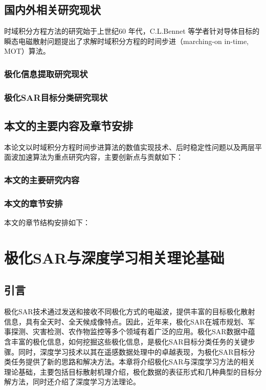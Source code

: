 \documentclass[promaster]{thesis-uestc}
\begin{document}
\section{国内外相关研究现状}
时域积分方程方法的研究始于上世纪60 年代，C.L.Bennet 等学者针对导体目标的瞬态电磁散射问题提出了求解时域积分方程的时间步进（marching-on in-time, MOT）算法。

\subsection{极化信息提取研究现状}
\subsection{极化SAR目标分类研究现状}

\section{本文的主要内容及章节安排}
本论文以时域积分方程时间步进算法的数值实现技术、后时稳定性问题以及两层平面波加速算法为重点研究内容，主要创新点与贡献如下：

\subsection{本文的主要研究内容}
\subsection{本文的章节安排}
本文的章节结构安排如下：

\chapter{极化SAR与深度学习相关理论基础}
\section{引言}
极化SAR技术通过发送和接收不同极化方式的电磁波，提供丰富的目标极化散射信息，具有全天时、全天候成像特点。因此，近年来，极化SAR在城市规划、军事探测、灾害检测、农作物监控等多个领域有着广泛的应用。极化SAR数据中蕴含丰富的极化信息，如何挖掘这些极化信息，是极化SAR目标分类任务的关键步骤。同时，深度学习技术以其在遥感数据处理中的卓越表现，为极化SAR目标分类任务提供了新的思路和解决方法。本章将介绍极化SAR与深度学习方法的相关理论基础，主要包括目标散射机理介绍，极化数据的表征形式和几种典型的目标分解方法，同时还介绍了深度学习方法理论。
\end{document}

